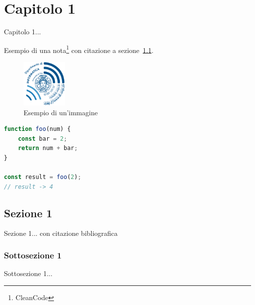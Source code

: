 \chapter{Capitolo 1}
\label{ch:capitolo1}


Capitolo 1...

Esempio di una nota\footnote{CleanCode} con citazione a sezione~\ref{sec:sezione1}.

\begin{figure}[H]
    \centering
    \includegraphics[width=0.2\textwidth]{immagini/logo-dip_blu_hr.png}
    \caption{Esempio di un'immagine}
    \label{fig:immagine1}
\end{figure}

\begin{lstlisting}[caption={Esempio codice JavaScript},label={Esempio codice JavaScript}, language=JavaScript]
function foo(num) {
    const bar = 2;
    return num + bar;
}

const result = foo(2);
// result -> 4
\end{lstlisting}


\section{Sezione 1}\label{sec:sezione1}


Sezione 1... con citazione bibliografica~\cite{CleanCode}

\subsection{Sottosezione 1}
\label{subsec:sottosezione1}

Sottosezione 1...